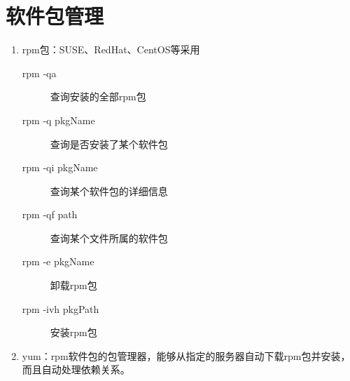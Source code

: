 \documentclass[11pt]{article}
\begin{document}
\section{软件包管理}
\begin{enumerate}
    \item rpm包：SUSE、RedHat、CentOS等采用
    \begin{description}
        \item[rpm -qa] 查询安装的全部rpm包
        \item[rpm -q pkgName] 查询是否安装了某个软件包
        \item[rpm -qi pkgName] 查询某个软件包的详细信息
        \item[rpm -qf path] 查询某个文件所属的软件包
        \item[rpm -e pkgName] 卸载rpm包
        \item[rpm -ivh pkgPath] 安装rpm包
    \end{description}
    \item yum：rpm软件包的包管理器，能够从指定的服务器自动下载rpm包并安装，而且自动处理依赖关系。
\end{enumerate}
\end{document}
